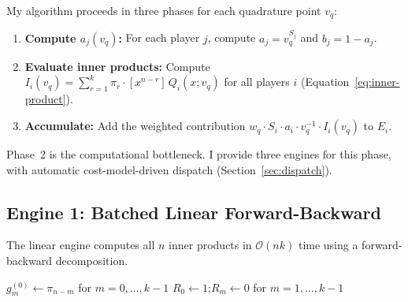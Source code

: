 \documentclass[11pt]{article}
\newcommand{\bigO}{\mathcal{O}}
\begin{document}
My algorithm proceeds in three phases for each quadrature point $v_q$:
\begin{enumerate}
  \item \textbf{Compute $a_j(v_q)$:} For each player $j$, compute
    $a_j = v_q^{S_j}$ and $b_j = 1 - a_j$.
  \item \textbf{Evaluate inner products:} Compute
    $I_i(v_q) = \sum_{r=1}^{k} \pi_r \cdot [x^{n-r}]\, Q_i(x; v_q)$
    for all players $i$ (Equation~\ref{eq:inner-product}).
  \item \textbf{Accumulate:} Add the weighted contribution
    $w_q \cdot S_i \cdot a_i \cdot v_q^{-1} \cdot I_i(v_q)$ to
    $E_i$.
\end{enumerate}

Phase~2 is the computational bottleneck. I provide three engines for this
phase, with automatic cost-model-driven dispatch
(Section~\ref{sec:dispatch}).

\subsection{Engine 1: Batched Linear Forward-Backward}\label{sec:linear}

The linear engine computes all $n$ inner products in $\bigO(nk)$ time using
a forward-backward decomposition.

\begin{algorithm}[H]
\caption{Linear Forward-Backward Engine}\label{alg:linear}
\DontPrintSemicolon
\SetAlgoLined
{}
\BlankLine
{}
$g^{(0)}_m \leftarrow \pi_{n-m}$ for $m = 0, \ldots, k-1$\;
\BlankLine
{}
$R_0 \leftarrow 1$;\quad $R_m \leftarrow 0$ for $m = 1, \ldots, k-1$\;
\end{algorithm}
\end{document}
